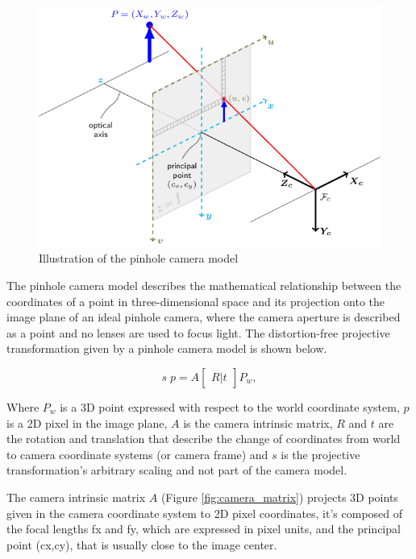 \begin{figure}[h]
  \centering
  \includegraphics[scale=0.3]{figures/pinhole.png}
  \caption{Illustration of the pinhole camera model}
  \label{img:pinhole_img}
\end{figure}

The pinhole camera model describes the mathematical relationship between the coordinates of a point in three-dimensional space and its projection onto the image plane of an ideal pinhole camera, where the camera aperture is described as a point and no lenses are used to focus light\cite{wikipinhole}.
The distortion-free projective transformation given by a pinhole camera model is shown below.

\[s \; p = A \begin{bmatrix} R|t \end{bmatrix} P_w,\]

Where \(P_w\) is a 3D point expressed with respect to the world coordinate system, \(p\) is a 2D pixel in the image plane, \(A\) is the camera intrinsic matrix, \(R\) and \(t\) are the rotation and translation that describe the change of coordinates from world to camera coordinate systems (or camera frame) and \(s\) is the projective transformation's arbitrary scaling and not part of the camera model\cite{opencvcalib}.

The camera intrinsic matrix \(A\) (Figure \ref{fig:camera_matrix}) projects 3D points given in the camera coordinate system to 2D pixel coordinates, it's composed of the focal lengths fx and fy, which are expressed in pixel units, and the principal point (cx,cy), that is usually close to the image center\cite{opencvcalib}\cite{888718}.

